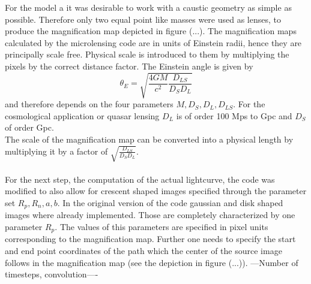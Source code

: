 For the model a it was desirable to work with a caustic geometry as simple as possible. Therefore only two equal point like masses were used as lenses, to produce the magnification map depicted in figure (...). The magnification maps calculated by the microlensing code are in units of Einstein radii, hence they are principally scale free. Physical scale is introduced to them by multiplying the pixels by the correct distance factor. The Einstein angle is given by   
\begin{equation}
\theta_{E}=\sqrt{\frac{4GM}{c^{2}} \frac{D_{LS}}{D_{S}D_{L}}} 
\end{equation}  
and therefore depends on the four parameters $M,D_{S},D_{L},D_{LS}$. For the cosmological application or quasar lensing $D_{L}$ is of order 100 Mps to Gpc and $D_{S}$ of order Gpc.\\   
The scale of the magnification map can be converted into a physical length by multiplying it by a factor of $ \sqrt{\frac{D_{LS}}{D_{S}D_{L}}}$.\\\\
For the next step, the computation of the actual lightcurve, the code was modified to also allow for crescent shaped images specified through the parameter set $R_p,R_n,a,b$. In the original version of the code gaussian and disk shaped images where already implemented. Those are completely characterized by one parameter $R_p$. The values of this parameters are specified in pixel units corresponding to the magnification map. Further one needs to specify the start and end point coordinates of the path which the center of the source image follows in the magnification map (see the depiction in figure (...)).  ---Number of timesteps, convolution----

